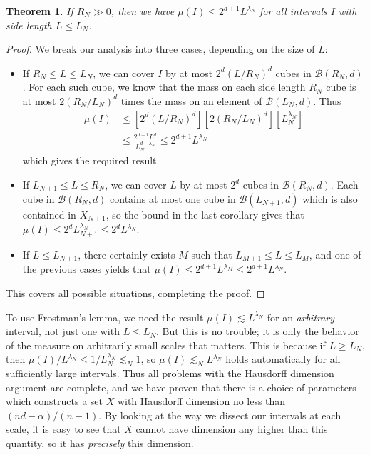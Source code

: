\documentclass{article}
\theoremstyle{plain}
\theoremstyle{plain}
\newtheorem{theorem}{Theorem}
\begin{document}
\begin{multicols}{2}
\begin{theorem}
	If $R_N \gg 0$, then we have $\mu(I) \leq 2^{d+1} L^{\lambda_N}$ for all intervals $I$ with side length $L \leq L_N$.
\end{theorem}
\begin{proof}
	We break our analysis into three cases, depending on the size of $L$:
	\begin{itemize}
		\item If $R_N \leq L \leq L_N$, we can cover $I$ by at most $2^d(L/R_N)^d$ cubes in $\mathcal{B}(R_N,d)$. For each such cube, we know that the mass on each side length $R_N$ cube is at most $2(R_N/L_N)^d$ times the mass on an element of $\mathcal{B}(L_N,d)$. Thus
		\begin{align*}
			\mu(I) &\leq [2^d(L/R_N)^d] [2(R_N/L_N)^d] [L_N^{\lambda_N}]\\
			&\leq \frac{2^{d+1} L^d}{L_N^{d - \lambda_N}} \leq 2^{d+1} L^{\lambda_N}
		\end{align*}
		which gives the required result.

		\item If $L_{N+1} \leq L \leq R_N$, we can cover $L$ by at most $2^d$ cubes in $\mathcal{B}(R_N,d)$. Each cube in $\mathcal{B}(R_N,d)$ contains at most one cube in $\mathcal{B}(L_{N+1},d)$ which is also contained in $X_{N+1}$, so the bound in the last corollary gives that $\mu(I) \leq 2^d L_{N+1}^{\lambda_N} \leq 2^d L^{\lambda_N}$.

		\item If $L \leq L_{N+1}$, there certainly exists $M$ such that $L_{M+1} \leq L \leq L_M$, and one of the previous cases yields that $\mu(I) \leq 2^{d+1} L^{\lambda_M} \leq 2^{d+1} L^{\lambda_N}$.
	\end{itemize}
	This covers all possible situations, completing the proof.
\end{proof}

To use Frostman's lemma, we need the result $\mu(I) \lesssim L^{\lambda_N}$ for an {\it arbitrary} interval, not just one with $L \leq L_N$. But this is no trouble; it is only the behavior of the measure on arbitrarily small scales that matters. This is because if $L \geq L_N$, then $\mu(I)/L^{\lambda_N} \leq 1/L_N^{\lambda_N} \lesssim_N 1$, so $\mu(I) \lesssim_N L^{\lambda_N}$ holds automatically for all sufficiently large intervals. Thus all problems with the Hausdorff dimension argument are complete, and we have proven that there is a choice of parameters which constructs a set $X$ with Hausdorff dimension no less than $(nd - \alpha)/(n-1)$. By looking at the way we dissect our intervals at each scale, it is easy to see that $X$ cannot have dimension any higher than this quantity, so it has {\it precisely} this dimension.


\end{multicols}
\end{document}
